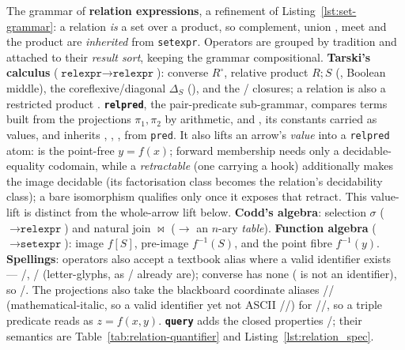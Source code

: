 \documentclass[11pt, a4paper]{article}
\begin{document}
\begin{listing}[htbp]
\caption{The grammar of \textbf{relation expressions}, a refinement of Listing~\ref{lst:set-grammar}: a relation \emph{is} a set over a product, so complement, union \cppinline{|}, meet \cppinline{&} and the product \cppinline{*} are \emph{inherited} from \texttt{setexpr}.
Operators are grouped by tradition and attached to their \emph{result sort}, keeping the grammar compositional.
\textbf{Tarski's calculus} ($\texttt{relexpr}\to\texttt{relexpr}$): converse $R^{\circ}$, relative product $R\mathbin{;}S$ (\cppinline{>>}, Boolean middle), the coreflexive/diagonal $\Delta_S$ (), and the / closures; a relation is also a restricted product .
\textbf{\texttt{relpred}}, the pair-predicate sub-grammar, compares terms built from the projections $\pi_1,\pi_2$ by arithmetic,  and , its constants carried as values, and inherits \cppinline{!}, \cppinline{&&}, \cppinline{||},  from \texttt{pred}.
It also lifts an arrow's \emph{value} into a \texttt{relpred} atom:  is the point-free $y=f(x)$; forward membership needs only a decidable-equality codomain, while a \emph{retractable}  (one carrying a  hook) additionally makes the image decidable (its factorisation class becomes the relation's decidability class); a bare isomorphism qualifies only once it exposes that retract.
This value-lift is distinct from the whole-arrow  lift below.
\textbf{Codd's algebra}: selection $\sigma$ ($\to\texttt{relexpr}$) and natural join $\bowtie$ ($\to$ an $n$-ary \emph{table}).
\textbf{Function algebra} ($\to\texttt{setexpr}$): image $f[S]$, pre-image $f^{-1}(S)$, and the point fibre $f^{-1}(y)$.
\textbf{Spellings}: operators also accept a textbook alias where a valid identifier exists --- /, / (letter-glyphs, as / already are); converse has none ( is not an identifier), so /.
The projections also take the blackboard coordinate aliases // (mathematical-italic, so a valid identifier yet not ASCII //) for //, so a triple predicate reads as $z = f(x,y)$.
\textbf{\texttt{query}} adds the closed properties /; their semantics are Table~\ref{tab:relation-quantifier} and Listing~\ref{lst:relation_spec}.
}
\end{listing}
\end{document}
